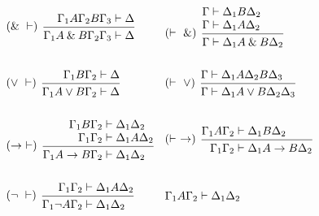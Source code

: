 \documentclass[main]{subfiles}
\begin{document}
\begin{align*}
     & \begin{prooftree}
           \hypo{\Gamma_1 A\Gamma_2 B\Gamma_3 &\vdash \Delta}
           \infer[left label=$(\and \ \vdash)$]1{\Gamma_1 A \and B \Gamma_2 \Gamma_3 &\vdash \Delta}
       \end{prooftree}       &
     & \begin{prooftree}
           \hypo{ \Gamma &\vdash \Delta_1 B\Delta_2}
           \infer[no rule]1{ \Gamma &\vdash \Delta_1A\Delta_2 }
           \infer[left label=$(\vdash \ \and)$]1{ \Gamma &\vdash \Delta_1 A \and B \Delta_2}
       \end{prooftree}
    \\
    \\
     & \begin{prooftree}
           \hypo{\Gamma_1 B\Gamma_2 &\vdash \Delta}
           \infer[left label=$(\lor \ \vdash)$]1{\Gamma_1 A\lor B\Gamma_2 &\vdash \Delta}
       \end{prooftree}                  &
     & \begin{prooftree}
           \hypo{\Gamma &\vdash \Delta_1A\Delta_2B\Delta_3}
           \infer[left label=$(\vdash \ \lor)$]1{\Gamma &\vdash \Delta_1 A\lor B\Delta_2\Delta_3}
       \end{prooftree}
    \\
    \\
     & \begin{prooftree}
           \hypo{\Gamma_1B\Gamma_2 &\vdash\Delta_1\Delta_2}
           \infer[no rule]1{\Gamma_1\Gamma_2 &\vdash \Delta_1 A \Delta_2}
           \infer[left label=$(\to \ \vdash)$]1{\Gamma_1 A\to B\Gamma_2 &\vdash \Delta_1 \Delta_2}
       \end{prooftree}         &
     & \begin{prooftree}
           \hypo{\Gamma_1A\Gamma_2 &\vdash \Delta_1B\Delta_2}
           \infer[left label=$(\vdash \ \to)$]1{\Gamma_1\Gamma_2 &\vdash \Delta_1A\to B \Delta_2}
       \end{prooftree}
    \\
    \\
     & \begin{prooftree}
           \hypo{\Gamma_1 \Gamma_2 &\vdash \Delta_1A\Delta_2}
           \infer[left label=$(\lnot\ \vdash)$]1{\Gamma_1 \lnot A\Gamma_2 &\vdash \Delta_1\Delta_2}
       \end{prooftree}        &
     & \begin{prooftree}
           \hypo{\Gamma_1 A\Gamma_2 &\vdash \Delta_1\Delta_2}

\end{prooftree}
\end{align*}
\end{document}
